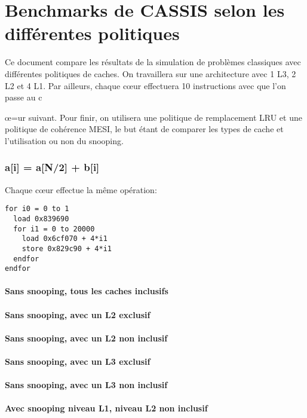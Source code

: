 \documentclass{article}
\begin{document}
\part*{Benchmarks de CASSIS selon les différentes politiques}
\indent Ce document compare les résultats de la simulation de problèmes classiques avec différentes politiques de caches. On travaillera sur une architecture avec 1 L3, 2 L2 et 4 L1. Par ailleurs, chaque c{\oe}ur effectuera 10 instructions avec que l'on passe au c{\oe=ur suivant. Pour finir, on utilisera une politique de remplacement LRU et une politique de cohérence MESI, le but étant de comparer les types de cache et l'utilisation ou non du snooping.

\section{a[i] = a[N/2] + b[i]}
\indent Chaque c{\oe}ur effectue la même opération:
\begin{verbatim}
for i0 = 0 to 1
  load 0x839690
  for i1 = 0 to 20000
    load 0x6cf070 + 4*i1
    store 0x829c90 + 4*i1
  endfor
endfor
\end{verbatim}

\subsection*{Sans snooping, tous les caches inclusifs}

\subsection*{Sans snooping, avec un L2 exclusif}

\subsection*{Sans snooping, avec un L2 non inclusif}

\subsection*{Sans snooping, avec un L3 exclusif}

\subsection*{Sans snooping, avec un L3 non inclusif}

\subsection*{Avec snooping niveau L1, niveau L2 non inclusif}

}
\end{document}
